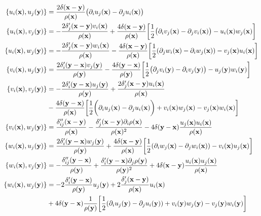 \documentclass[a4paper,aps,prd,preprint,groupedaddress]{revtex4}
\begin{document}
\begin{equation}
\begin{split}
\{u_i({\bf x}), u_j({\bf y})\}&=\frac{2\delta({\bf x}-{\bf y})}{\rho({\bf x})}\bigl(\partial_i u_j({\bf x})-\partial_j u_i({\bf x})\bigr)\\
\{u_i({\bf x}), v_j({\bf y})\}&=-\frac{2\delta_j'({\bf x}-{\bf y})v_i({\bf x})}{\rho({\bf x})}
+\frac{4\delta({\bf x}-{\bf y})}{\rho({\bf x})}\biggl[\frac{1}{2}\bigl(\partial_iv_j({\bf x})-\partial_jv_i({\bf x})\bigr) -u_i({\bf x})w_j({\bf x})\biggr]\\
\{ u _i({\bf x}),w_j({\bf y})\}&=-\frac{2\delta_j'({\bf x}-{\bf y})w_i({\bf x})}{\rho({\bf x})}-\frac{4\delta({\bf x}-{\bf y})}{\rho({\bf x})}\biggl[\frac{1}{2}(\partial_jw_i({\bf x})-\partial_iw_j({\bf x})) -v_j({\bf x})u_i({\bf x})\biggr]\\
\{v_i({\bf x}), u_j({\bf y})\}&=\frac{2\delta_i'({\bf y}-{\bf x})v_j({\bf y})}{\rho({\bf y})}
-\frac{4\delta({\bf y}-{\bf x})}{\rho({\bf y})}\biggl[\frac{1}{2}\bigl(\partial_jv_i({\bf y})-\partial_iv_j({\bf y})\bigr) -u_j({\bf y})w_i({\bf y})\biggr]\\
\{v_i({\bf x}), v_j({\bf y})\}&=-\frac{2\delta_i'({\bf y}-{\bf x})u_j({\bf y})}{\rho({\bf y})}+\frac{2\delta_j'({\bf x}-{\bf y})u_i({\bf x})}{\rho({\bf x})}\\
&-\frac{4\delta({\bf y}-{\bf x})}{\rho({\bf x})}\biggl[\frac{1}{2}\biggl(\partial_iu_j({\bf x})-\partial_ju_i({\bf x})\biggr)+v_i({\bf x})w_j({\bf x})-v_j({\bf x})w_i({\bf x})\biggr]\\
\{v_i({\bf x}), w _j({\bf y})\}&=\frac{\delta_{ij}''({\bf x}-{\bf y})}{\rho({\bf x})}-\frac{\delta_j'({\bf x}-{\bf y})\partial_i\rho({\bf x})}{\rho({\bf x})^2}
-4\delta({\bf y}-{\bf x})\frac{u_j({\bf x})u_i({\bf x})}{\rho({\bf x})}\\
\{w_i({\bf x}), u _j({\bf y})\}&=\frac{2\delta_i'({\bf y}-{\bf x})w_j({\bf y})}{\rho({\bf y})}+\frac{4\delta({\bf x}-{\bf y})}{\rho({\bf x})}\biggl[\frac{1}{2}(\partial_iw_j({\bf x})-\partial_jw_i({\bf x})) -v_i({\bf x})u_j({\bf x})\biggr]\\
\{w_i({\bf x}), v _j({\bf y})\}&=-\frac{\delta_{ij}''({\bf y}-{\bf x})}{\rho({\bf y})}+\frac{\delta_i'({\bf y}-{\bf x})\partial_j\rho({\bf y})}{\rho({\bf y})^2}
+4\delta({\bf x}-{\bf y})\frac{u_i({\bf x})u_j({\bf x})}{\rho({\bf x})}\\
\{w_i({\bf x}), w_j({\bf y})\}&=-2\frac{\delta_i'({\bf y}-{\bf x})}{\rho({\bf y})}u_j({\bf y})+2\frac{\delta_j'({\bf x}-{\bf y})}{\rho({\bf x})}u_i({\bf x})\\
&+4\delta({\bf y}-{\bf x})\frac{1}{\rho({\bf y})}\biggl[\frac{1}{2}(\partial_iu_j({\bf y})-\partial_ju_i({\bf y}))+v_i({\bf y})w_j({\bf y})-v_j({\bf y})w_i({\bf y})\biggr]\\
\end{split}
\end{equation}
\end{document}
